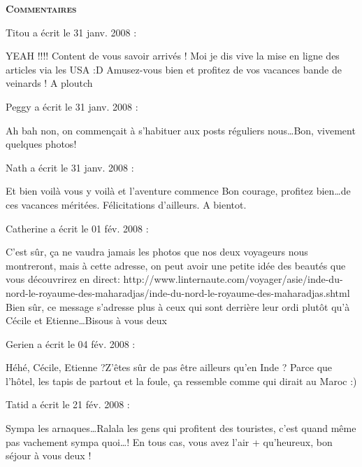 \bigskip
\textbf{\textsc{Commentaires}}

\medskip
Titou a écrit le 31 janv. 2008 :
\begin{displayquote}
YEAH !!!!
Content de vous savoir arrivés ! Moi je dis vive la mise en ligne des articles via les USA :D Amusez-vous bien et profitez de vos vacances bande de veinards ! A ploutch
\end{displayquote}

\medskip
Peggy a écrit le 31 janv. 2008 :
\begin{displayquote}
Ah bah non, on commençait à s'habituer aux posts réguliers nous\dots Bon, vivement quelques photos!
\end{displayquote}

\medskip
Nath a écrit le 31 janv. 2008 :
\begin{displayquote}
Et bien voilà vous y voilà  et l'aventure commence
Bon courage, profitez bien\dots de ces vacances méritées. Félicitations d'ailleurs.
A bientot.
\end{displayquote}

\medskip
Catherine a écrit le 01 fév. 2008 :
\begin{displayquote}
C'est sûr, ça ne vaudra jamais les photos que nos deux voyageurs nous montreront, mais à cette adresse, on peut avoir une petite idée des beautés que vous découvrirez en direct:
http://www.linternaute.com/voyager/asie/inde-du-nord-le-royaume-des-maharadjas/inde-du-nord-le-royaume-des-maharadjas.shtml
Bien sûr, ce message s'adresse plus à ceux qui sont derrière leur ordi plutôt qu'à Cécile et Etienne\dots Bisous à vous deux
\end{displayquote}

\medskip
Gerien a écrit le 04 fév. 2008 :
\begin{displayquote}
Héhé,
Cécile, Etienne ?Z'êtes sûr de pas être ailleurs qu'en Inde ?
Parce que l'hôtel, les tapis de partout et la foule, ça ressemble comme qui dirait au Maroc :)
\end{displayquote}

\medskip
Tatid a écrit le 21 fév. 2008 :
\begin{displayquote}
Sympa les arnaques\dots Ralala les gens qui profitent des touristes, c'est quand même pas vachement sympa quoi\dots !
En tous cas, vous avez l'air + qu'heureux, bon séjour à vous deux !
\end{displayquote}

\vfill
